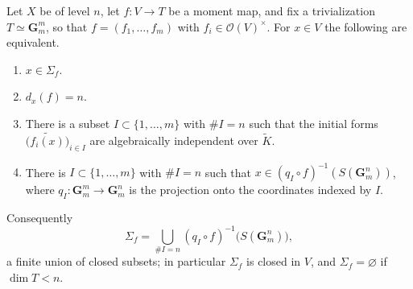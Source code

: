 \begin{theorem}
\label{thm:trop-sigma-characterization}
Let $X$ be of level $n$, let $f:V\to T$ be a moment map, and fix a
trivialization $T\simeq\mathbf G_{m}^m$, so that $f=(f_1,\ldots,f_m)$ with
$f_i\in\mathcal O(V)^\times$. For $x\in V$ the following are equivalent.
\begin{enumerate}
\item\label{itm:trop-sigmachar:def} $x\in\Sigma_f$.
\item\label{itm:trop-sigmachar:deg} $d_x(f)=n$.
\item\label{itm:trop-sigmachar:coord} There is a subset
  $I\subset\{1,\ldots,m\}$ with $\#I=n$ such that the initial forms
  $\bigl(\widetilde{f_i(x)}\bigr)_{i\in I}$ are algebraically independent
  over $\widetilde K$.
\item\label{itm:trop-sigmachar:proj} There is $I\subset\{1,\ldots,m\}$ with
  $\#I=n$ such that $x\in(q_I\circ f)^{-1}(S(\mathbf G_m^n))$, where
  $q_I:\mathbf G_m^m\to\mathbf G_m^n$ is the projection onto the coordinates
  indexed by $I$.
\end{enumerate}
Consequently
\begin{equation}
\label{eq:trop-sigma-finite-union}
 \Sigma_f=\bigcup_{\#I=n}(q_I\circ f)^{-1}\bigl(S(\mathbf G_m^n)\bigr),
\end{equation}
a finite union of closed subsets; in particular $\Sigma_f$ is closed in $V$,
and $\Sigma_f=\varnothing$ if $\dim T<n$.
\end{theorem}

